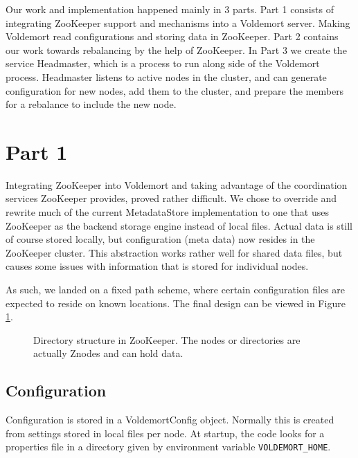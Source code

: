 
Our work and implementation happened mainly in 3 parts. Part 1 consists of integrating ZooKeeper support and mechanisms into a Voldemort server. Making Voldemort read configurations and storing data in ZooKeeper. Part 2 contains our work towards rebalancing by the help of ZooKeeper. In Part 3 we create the service Headmaster, which is a process to run along side of the Voldemort process. Headmaster listens to active nodes in the cluster, and can generate configuration for new nodes, add them to the cluster, and prepare the members for a rebalance to include the new node.

\section{Part 1}
Integrating ZooKeeper into Voldemort and taking advantage of the coordination services ZooKeeper provides, proved rather difficult.
We chose to override and rewrite much of the current MetadataStore implementation to one that uses ZooKeeper as the backend storage engine instead of local files. 
Actual data is still of course stored locally, but configuration (meta data) now resides in the ZooKeeper cluster.
This abstraction works rather well for shared data files, but causes some issues with information that is stored for individual nodes.

As such, we landed on a fixed path scheme, where certain configuration files are expected to reside on known locations. The final design can be viewed in Figure \ref{fig:dirstruct}.
\begin{figure}[h]
\label{fig:dirstruct}
\caption{Directory structure in ZooKeeper. The nodes or directories are actually Znodes and can hold data.}
\end{figure}

\subsection{Configuration}
Configuration is stored in a VoldemortConfig object. Normally this is created from settings stored in local files per node. At startup, the code looks for a properties file in a directory given by environment variable \texttt{VOLDEMORT\_HOME}. 

